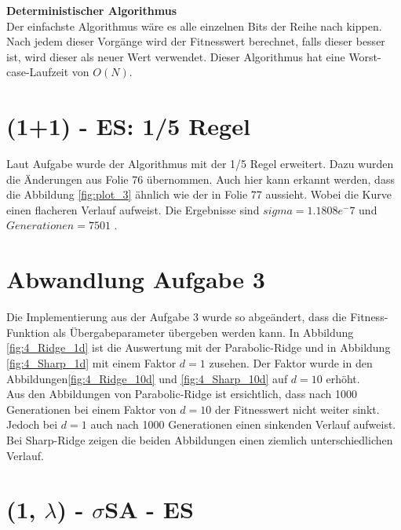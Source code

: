 \textbf{Deterministischer Algorithmus}\\

Der einfachste Algorithmus wäre es alle einzelnen Bits der Reihe nach kippen. Nach jedem dieser Vorgänge wird der Fitnesswert berechnet, falls dieser besser ist, wird dieser als neuer Wert verwendet. Dieser Algorithmus hat eine Worst-case-Laufzeit von $O(N)$.

\chapter{(1+1) - ES: 1/5 Regel}

Laut Aufgabe wurde der Algorithmus mit der 1/5 Regel erweitert. Dazu wurden die Änderungen aus Folie 76 übernommen. Auch hier kann erkannt werden, dass die Abbildung \ref{fig:plot_3} ähnlich wie der in Folie 77 aussieht. Wobei die Kurve einen flacheren Verlauf aufweist. Die Ergebnisse sind $sigma = 1.1808e^-7$ und $Generationen = 7501$ .


\chapter{Abwandlung Aufgabe 3}

Die Implementierung aus der Aufgabe 3 wurde so abgeändert, dass die Fitness-Funktion als Übergabeparameter übergeben werden kann. In Abbildung \ref{fig:4_Ridge_1d} ist die Auswertung mit der Parabolic-Ridge und in Abbildung \ref{fig:4_Sharp_1d} mit einem Faktor $d=1$ zusehen. Der Faktor wurde in den Abbildungen\ref{fig:4_Ridge_10d} und \ref{fig:4_Sharp_10d} auf $d=10$ erhöht.\\
Aus den Abbildungen von Parabolic-Ridge ist ersichtlich, dass nach 1000 Generationen bei einem Faktor von $d = 10$ der Fitnesswert nicht weiter sinkt. Jedoch bei $d = 1$ auch nach 1000 Generationen einen sinkenden Verlauf aufweist.\\
Bei Sharp-Ridge zeigen die beiden Abbildungen einen ziemlich unterschiedlichen Verlauf.


\chapter{(1, $\lambda$) - $\sigma$SA - ES}

